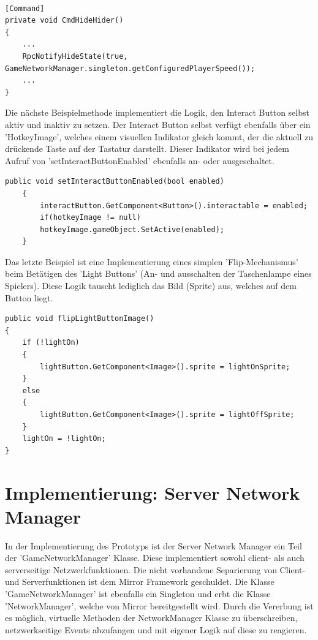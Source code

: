\begin{lstlisting}[caption= HiderScript.cs Subscribe to InGameUiControllerScript Event]
	
[Command]
private void CmdHideHider()
{
	...
	RpcNotifyHideState(true, GameNetworkManager.singleton.getConfiguredPlayerSpeed());
	...
}	
\end{lstlisting}

Die nächste Beispielmethode implementiert die Logik, den Interact Button selbst aktiv und inaktiv zu setzen. Der Interact Button selbst verfügt ebenfalls über ein 'HotkeyImage', welches einem visuellen Indikator gleich kommt, der die aktuell zu drückende Taste auf der Tastatur darstellt. Dieser Indikator wird bei jedem Aufruf von 'setInteractButtonEnabled' ebenfalls an- oder ausgeschaltet.

\begin{lstlisting}[caption= InGameUiControllerScript.cs setInteractButtonEnabled]
public void setInteractButtonEnabled(bool enabled)
	{
		interactButton.GetComponent<Button>().interactable = enabled;
		if(hotkeyImage != null)
		hotkeyImage.gameObject.SetActive(enabled);
	}
\end{lstlisting}

Das letzte Beispiel ist eine Implementierung eines simplen 'Flip-Mechanismus' beim Betätigen des 'Light Buttons' (An- und ausschalten der Taschenlampe eines Spielers). Diese Logik tauscht lediglich das Bild (Sprite) aus, welches auf dem Button liegt.

\begin{lstlisting}[caption= InGameUiControllerScript.cs flipLightButtonImage]
public void flipLightButtonImage()
{
	if (!lightOn)
	{
		lightButton.GetComponent<Image>().sprite = lightOnSprite;
	}
	else
	{
		lightButton.GetComponent<Image>().sprite = lightOffSprite;
	}
	lightOn = !lightOn;
}
\end{lstlisting}


\section{Implementierung: Server Network Manager}

In der Implementierung des Prototyps ist der Server Network Manager ein Teil der 'GameNetworkManager' Klasse. Diese implementiert sowohl client- als auch serverseitige Netzwerkfunktionen. Die nicht vorhandene Separierung von Client- und Serverfunktionen ist dem Mirror Framework geschuldet. Die Klasse 'GameNetworkManager' ist ebenfalls ein Singleton und erbt die Klasse 'NetworkManager', welche von Mirror bereitgestellt wird. Durch die Vererbung ist es möglich, virtuelle Methoden\cite{Billwagner.08.02.2022} der NetworkManager Klasse zu überschreiben, netzwerkseitige Events abzufangen und mit eigener Logik auf diese zu reagieren. 

